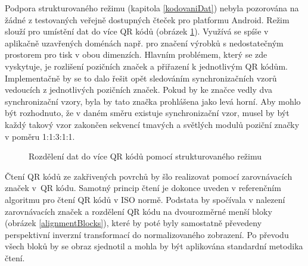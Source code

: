Podpora strukturovaného režimu (kapitola \ref{kodovaniDat}) nebyla pozorována na žádné z
testovaných veřejně dostupných čteček pro platformu Android. Režim  slouží pro umístění
dat do více QR kódů (obrázek \ref{qrdiv}). Využívá se spíše v aplikačně
uzavřených doménách např. pro značení výrobků s nedostatečným prostorem pro tisk v obou
dimenzích. Hlavním problémem, který se zde vyskytuje, je rozlišení pozičních
značek a přiřazení k jednotlivým QR kódům. Implementačně by se to dalo řešit
opět sledováním synchronizačních vzorů vedoucích z jednotlivých pozičních
značek. Pokud by ke značce vedly dva synchronizační vzory, byla by tato
značka prohlášena jako levá horní. Aby mohlo být rozhodnuto, že v daném směru
existuje synchronizační vzor, musel by být každý takový vzor zakončen sekvencí
tmavých a světlých modulů poziční značky v poměru 1:1:3:1:1.

 \begin{figure}[H]
  \begin{center}
    \caption{Rozdělení dat do více QR kódů pomocí strukturovaného režimu
    \cite{DensoQRFeatures}}
    \label{qrdiv}
  \end{center}
\end{figure}

Čtení QR kódů ze zakřivených povrchů by šlo realizovat pomocí zarovnávacích
značek v~QR kódu. Samotný princip čtení je dokonce uveden v referenčním
algoritmu pro čtení QR kódů v ISO normě. Podstata by spočívala v nalezení
zarovnávacích značek a rozdělení QR kódu na dvourozměrné menší bloky
(obrázek \ref{alignmentBlocks}), které by poté byly samostatně převedeny
perspektivní inverzní transformací do normalizovaného zobrazení. Po převodu všech bloků by se obraz
sjednotil a mohla by být aplikována standardní metodika čtení.
 
